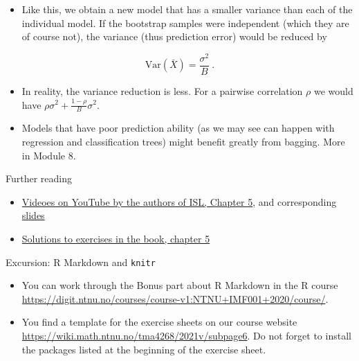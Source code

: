 \documentclass[10pt,ignorenonframetext,]{beamer}
\providecommand{\tightlist}{%
  \setlength{\itemsep}{0pt}\setlength{\parskip}{0pt}}
\begin{document}
\begin{frame}

\begin{itemize}
\tightlist
\item
  Like this, we obtain a new model that has a smaller variance than each
  of the individual model. If the bootstrap samples were independent
  (which they are of course not), the variance (thus prediction error)
  would be reduced by
\end{itemize}

\[\text{Var}(\bar{X})=\frac{\sigma^2}{B} \ .\] \vspace{2mm}

\begin{itemize}
\tightlist
\item
  In reality, the variance reduction is less. For a pairwise correlation
  \(\rho\) we would have \(\rho\sigma^2 + \frac{1-\rho}{B}\sigma^2\).
\end{itemize}

\vspace{2mm}

\begin{itemize}
\tightlist
\item
  Models that have poor prediction ability (as we may see can happen
  with regression and classification trees) might benefit greatly from
  bagging. More in Module 8.
\end{itemize}

\end{frame}

\begin{frame}{Further reading}
\protect\hypertarget{further-reading}{}

\begin{itemize}
\tightlist
\item
  \href{https://www.youtube.com/playlist?list=PL5-da3qGB5IA6E6ZNXu7dp89_uv8yocmf}{Videoes
  on YouTube by the authors of ISL, Chapter 5}, and corresponding
  \href{https://lagunita.stanford.edu/c4x/HumanitiesScience/StatLearning/asset/cv_boot.pdf}{slides}
\item
  \href{https://rstudio-pubs-static.s3.amazonaws.com/65561_43c0eaaa8565414eae333b47038f716c.html}{Solutions
  to exercises in the book, chapter 5}
\end{itemize}

\end{frame}

\begin{frame}{Excursion: R Markdown and \texttt{knitr}}
\protect\hypertarget{excursion-r-markdown-and-knitr}{}

\begin{itemize}
\item
  You can work through the Bonus part about R Markdown in the R course
  \url{https://digit.ntnu.no/courses/course-v1:NTNU+IMF001+2020/course/}.
\item
  You find a template for the exercise sheets on our course website
  \url{https://wiki.math.ntnu.no/tma4268/2021v/subpage6}. Do not forget
  to install the packages listed at the beginning of the exercise sheet.
\end{itemize}

\end{frame}
\end{document}
